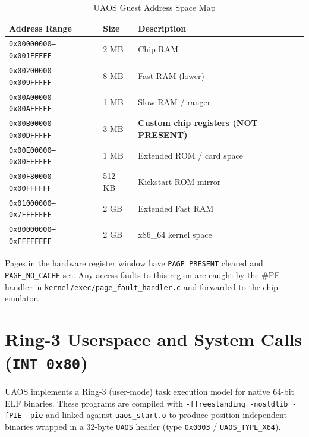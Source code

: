 \documentclass[11pt,a4paper]{report}
\begin{document}
\begin{table}[h]
    \centering
    \begin{tabular}{lll}
        \toprule
        \textbf{Address Range} & \textbf{Size} & \textbf{Description} \\
        \midrule
        \texttt{0x00000000--0x001FFFFF} & 2 MB  & Chip RAM \\
        \texttt{0x00200000--0x009FFFFF} & 8 MB  & Fast RAM (lower) \\
        \texttt{0x00A00000--0x00AFFFFF} & 1 MB  & Slow RAM / ranger \\
        \texttt{0x00B00000--0x00DFFFFF} & 3 MB  & \textbf{Custom chip registers (NOT PRESENT)} \\
        \texttt{0x00E00000--0x00EFFFFF} & 1 MB  & Extended ROM / card space \\
        \texttt{0x00F80000--0x00FFFFFF} & 512 KB & Kickstart ROM mirror \\
        \texttt{0x01000000--0x7FFFFFFF} & 2 GB  & Extended Fast RAM \\
        \texttt{0x80000000--0xFFFFFFFF} & 2 GB  & x86\_64 kernel space \\
        \bottomrule
    \end{tabular}
    \caption{UAOS Guest Address Space Map}
    \label{tab:memmap}
\end{table}

Pages in the hardware register window have \texttt{PAGE\_PRESENT} cleared and
\texttt{PAGE\_NO\_CACHE} set.  Any access faults to this region are caught by
the \#PF handler in \texttt{kernel/exec/page\_fault\_handler.c} and forwarded
to the chip emulator.

\section{Ring-3 Userspace and System Calls (\texttt{INT 0x80})}

UAOS implements a Ring-3 (user-mode) task execution model for native 64-bit ELF binaries. These programs are compiled with \texttt{-ffreestanding -nostdlib -fPIE -pie} and linked against \texttt{uaos\_start.o} to produce position-independent binaries wrapped in a 32-byte \texttt{UAOS} header (type \texttt{0x0003} / \texttt{UAOS\_TYPE\_X64}).
\end{document}
